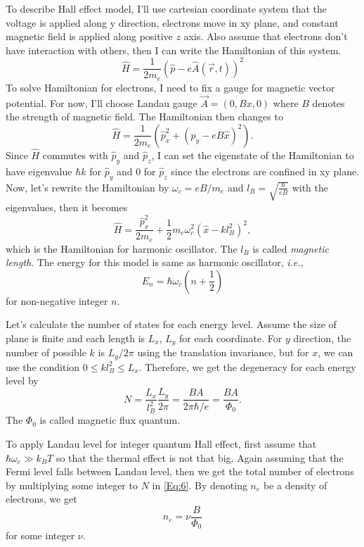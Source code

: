 \documentclass[%
 reprint,
 amsmath,amssymb,
 aps,
 prl,
]{revtex4-1}
\begin{document}
To describe Hall effect model, I'll use cartesian coordinate system that the voltage is applied along y direction, electrons move in xy plane, and constant magnetic field is applied along positive $z$ axis. Also assume that electrons don't have interaction with others, then I can write the Hamiltonian of this system.
\begin{equation}
\hat{H} = \frac{1}{2m_e}\left(\hat{p}-e\hat{A}(\vec{r}, t)\right)^2
\end{equation}
To solve Hamiltonian for electrons, I need to fix a gauge for magnetic vector potential. For now, I'll choose Landau gauge $\vec{A}=(0, Bx, 0)$ where $B$ denotes the strength of magnetic field. The Hamiltonian then changes to
\begin{equation}
\hat{H} = \frac{1}{2m_e}\left(\hat{p}_x^2+(\hat{p}_y-eB\hat{x})^2\right).
\end{equation}
Since $\hat{H}$ commutes with $\hat{p}_y$ and $\hat{p}_z$, I can set the eigenstate of the Hamiltonian to have eigenvalue $\hbar k$ for $\hat{p}_y$ and 0 for $\hat{p}_z$ since the electrons are confined in xy plane. Now, let's rewrite the Hamiltonian by $\omega_c = eB/m_e$ and $l_B = \sqrt{\frac{\hbar}{eB}}$ with the eigenvalues, then it becomes
\begin{equation}
\hat{H} = \frac{\hat{p}_x^2}{2m_e} + \frac{1}{2}m_e\omega_c^2(\hat{x}-kl_B^2)^2,
\end{equation}
which is the Hamiltonian for harmonic oscillator. The $l_B$ is called \textit{magnetic length}. The energy for this model is same as harmonic oscillator, \textit{i.e.}, 
\begin{equation}
    E_n = \hbar \omega_c \left(n+\frac{1}{2}\right)
\end{equation}
for non-negative integer $n$.

Let's calculate the number of states for each energy level. Assume the size of plane is finite and each length is $L_x$, $L_y$ for each coordinate. For $y$ direction, the number of possible $k$ is $L_y/2\pi$ using the translation invariance, but for $x$, we can use the condition $0\leq kl_B^2\leq L_x$. Therefore, we get the degeneracy for each energy level by
\begin{equation}\label{Eq:6}
    N = \frac{L_x}{l_B^2}\frac{L_y}{2\pi} = \frac{BA}{2\pi\hbar/e} = \frac{BA}{\Phi_0}.
\end{equation}
The $\Phi_0$ is called magnetic flux quantum.

To apply Landau level for integer quantum Hall effect, first assume that $\hbar \omega_c\gg k_B T$ so that the thermal effect is not that big. Again assuming that the Fermi level falls between Landau level, then we get the total number of electrons by multiplying some integer to $N$ in \eqref{Eq:6}. By denoting $n_e$ be a density of electrons, we get
\begin{equation}
    n_e = \nu \frac{B}{\Phi_0}
\end{equation}
for some integer $\nu$.
\end{document}

